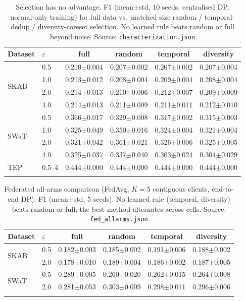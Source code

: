 \documentclass[pdflatex,sn-mathphys-num]{sn-jnl}
\theoremstyle{thmstyleone}
\theoremstyle{thmstyletwo}
\theoremstyle{thmstylethree}
\begin{document}
\begin{table}[t]
\centering
\caption{Selection has no advantage. F1 (mean$\pm$std, $10$ seeds, centralised DP,
normal-only training) for full data vs.\ matched-size random / temporal-dedup /
diversity-coreset selection. No learned rule beats random or full beyond noise.
Source: \texttt{characterization.json}}\label{tab:char}
\setlength{\tabcolsep}{4pt}
\begin{tabular}{@{}llcccc@{}}
\toprule
Dataset & $\varepsilon$ & full & random & temporal & diversity \\
\midrule
\multirow{4}{*}{SKAB} & 0.5 & 0.210$\pm$0.004 & 0.207$\pm$0.002 & 0.207$\pm$0.002 & 0.207$\pm$0.004 \\
 & 1.0 & 0.213$\pm$0.012 & 0.208$\pm$0.004 & 0.209$\pm$0.004 & 0.208$\pm$0.004 \\
 & 2.0 & 0.214$\pm$0.013 & 0.210$\pm$0.006 & 0.212$\pm$0.007 & 0.209$\pm$0.009 \\
 & 4.0 & 0.214$\pm$0.013 & 0.211$\pm$0.009 & 0.211$\pm$0.011 & 0.212$\pm$0.010 \\
\midrule
\multirow{4}{*}{SWaT} & 0.5 & 0.366$\pm$0.017 & 0.329$\pm$0.008 & 0.317$\pm$0.002 & 0.315$\pm$0.003 \\
 & 1.0 & 0.325$\pm$0.049 & 0.350$\pm$0.016 & 0.324$\pm$0.004 & 0.321$\pm$0.004 \\
 & 2.0 & 0.321$\pm$0.042 & 0.361$\pm$0.021 & 0.326$\pm$0.006 & 0.325$\pm$0.005 \\
 & 4.0 & 0.325$\pm$0.037 & 0.337$\pm$0.040 & 0.303$\pm$0.024 & 0.304$\pm$0.029 \\
\midrule
TEP & 0.5--4 & 0.444$\pm$0.000 & 0.444$\pm$0.000 & 0.444$\pm$0.000 & 0.444$\pm$0.000 \\
\botrule
\end{tabular}
\end{table}

\begin{table}[t]
\centering
\caption{Federated all-arms comparison (FedAvg, $K{=}5$ contiguous clients,
end-to-end DP). F1 (mean$\pm$std, $5$ seeds). No learned rule (temporal, diversity)
beats random or full; the best method alternates across cells. Source:
\texttt{fed\_allarms.json}}\label{tab:fedarms}
\setlength{\tabcolsep}{4pt}
\begin{tabular}{@{}llcccc@{}}
\toprule
Dataset & $\varepsilon$ & full & random & temporal & diversity \\
\midrule
\multirow{2}{*}{SKAB} & 0.5 & 0.182$\pm$0.003 & 0.185$\pm$0.002 & 0.191$\pm$0.006 & 0.188$\pm$0.002 \\
 & 2.0 & 0.178$\pm$0.010 & 0.189$\pm$0.004 & 0.186$\pm$0.002 & 0.187$\pm$0.005 \\
\midrule
\multirow{2}{*}{SWaT} & 0.5 & 0.289$\pm$0.005 & 0.260$\pm$0.020 & 0.262$\pm$0.015 & 0.264$\pm$0.008 \\
 & 2.0 & 0.281$\pm$0.053 & 0.303$\pm$0.009 & 0.298$\pm$0.011 & 0.296$\pm$0.006 \\
\botrule
\end{tabular}
\end{table}
\end{document}
